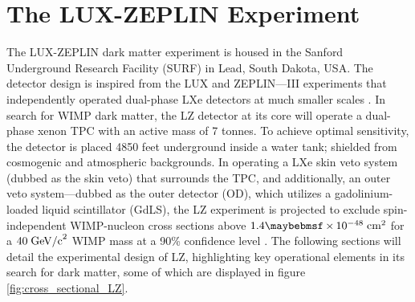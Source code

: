 \section{The LUX-ZEPLIN Experiment}
\label{sec:lz_detector}

The LUX-ZEPLIN dark matter experiment is housed in the Sanford Underground Research Facility (SURF) in Lead, South Dakota, USA. The detector design is inspired from the LUX and ZEPLIN---III experiments that independently operated dual-phase LXe detectors at much smaller scales \cite{LUX_experiment, zeplin3}. In search for WIMP dark matter, the LZ detector at its core will operate a dual-phase xenon TPC with an active mass of 7 tonnes. To achieve optimal sensitivity, the detector is placed 4850 feet underground inside a water tank; shielded from cosmogenic and atmospheric backgrounds. In operating a LXe skin veto system (dubbed as the skin veto) that surrounds the TPC, and additionally, an outer veto system---dubbed as the outer detector (OD), which utilizes a gadolinium-loaded liquid scintillator (GdLS), the LZ experiment is projected to exclude spin-independent WIMP-nucleon cross sections above $1.4 \times 10^{-48} \; \MathText{cm}^{2}$ for a $40 \; \text{GeV/c}^{2}$ WIMP mass at a 90\% confidence level \cite{akerib2018projected}. The following sections will detail the experimental design of LZ, highlighting key operational elements in its search for dark matter, some of which are displayed in figure \ref{fig:cross_sectional_LZ}.

